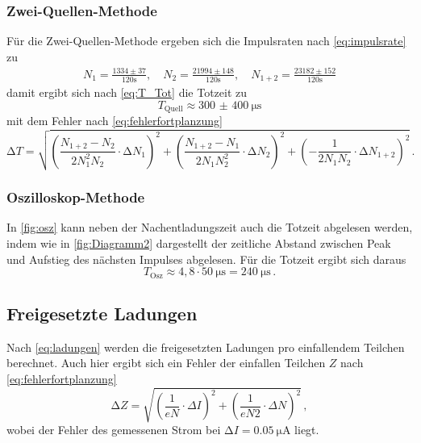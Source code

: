 \subsubsection*{Zwei-Quellen-Methode}

Für die Zwei-Quellen-Methode ergeben sich die Impulsraten nach \autoref{eq:impulsrate} zu
\begin{align*}
    N_{1}   =\frac{1334 \pm 37}{120 \mathrm{s}}, \quad 
    N_{2}   =\frac{21994 \pm 148}{120 \mathrm{s}}, \quad 
    N_{1+2} =\frac{23182 \pm 152}{120 \mathrm{s}}
\end{align*}
damit ergibt sich nach \autoref{eq:T_Tot} die Totzeit zu
\begin{equation}
    T_\text{Quell} \approx \qty{300(400)}{\micro\second}
\end{equation}
mit dem Fehler nach \autoref{eq:fehlerfortplanzung}
\begin{equation*}
    \increment T  = \sqrt{
      \left(\frac{N_{1+2}-N_{2}}{2 N_{1}^{2} N_{2}} \cdot \increment N_{1}\right)^{2} 
    + \left(\frac{N_{1+2}-N_{1}}{2 N_{1} N_{2}^{2}} \cdot \increment N_{2}\right)^{2} 
    + \left(-\frac{1}{2 N_{1} N_{2}} \cdot \increment N_{1+2}\right)^{2}
    } \, .
\end{equation*}

\subsubsection*{Oszilloskop-Methode}

In \autoref{fig:osz} kann neben der Nachentladungszeit auch die Totzeit abgelesen werden, 
indem wie in \autoref{fig:Diagramm2} dargestellt der zeitliche Abstand zwischen Peak und Aufstieg
des nächsten Impulses abgelesen. Für die Totzeit ergibt sich daraus
\begin{equation*}
    T_\text{Osz} \approx 4,8 \cdot \qty{50}{\micro\second} = \qty{240}{\micro\second} \, .
\end{equation*}


\subsection{Freigesetzte Ladungen}

Nach \autoref{eq:ladungen} werden die freigesetzten Ladungen pro einfallendem Teilchen berechnet.
Auch hier ergibt sich ein Fehler der einfallen Teilchen $Z$ nach \autoref{eq:fehlerfortplanzung}
\begin{equation*}
    \increment Z 
    = \sqrt{\left(\frac{1}{e N} \cdot \Delta I\right)^{2}+\left(\frac{1}{e N 2} \cdot \Delta N\right)^{2}} \, ,
\end{equation*}
wobei der Fehler des gemessenen Strom bei $\increment I = \qty{0.05}{\micro\ampere}$ liegt.

